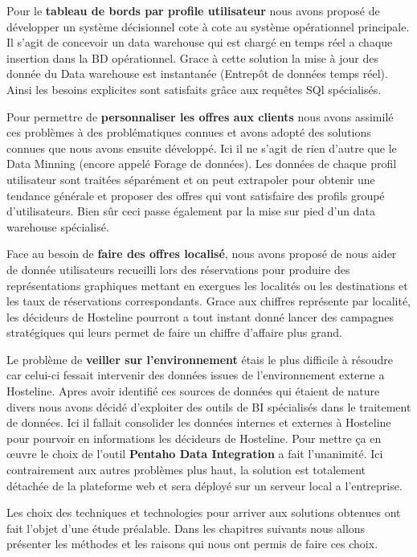 \begin{list}{•}{ }
\item Pour le \textbf{tableau de bords par profile utilisateur} nous avons proposé de développer un système décisionnel cote à cote au système opérationnel principale. Il s’agit de concevoir un data warehouse qui est chargé en temps réel a chaque insertion dans la BD opérationnel. Grace à cette solution la mise à jour des donnée du Data warehouse est instantanée (Entrepôt de données temps réel).  Ainsi les besoins explicites sont satisfaits grâce aux requêtes SQl spécialisés.\\

\item Pour permettre de \textbf{personnaliser les offres aux clients} nous avons assimilé ces problèmes à des problématiques connues et avons adopté des solutions connues que nous avons ensuite développé. Ici il ne s’agit de rien d’autre que le Data Minning (encore appelé Forage de données). Les données de chaque profil utilisateur sont traitées séparément et on peut extrapoler pour obtenir une tendance générale et proposer des offres qui vont satisfaire des profils groupé d’utilisateurs. Bien sûr ceci passe également par la mise sur pied d’un data warehouse spécialisé.

\item Face au besoin de \textbf{faire des offres localisé}, nous avons proposé de nous aider de donnée utilisateurs recueilli lors des réservations pour produire des représentations graphiques mettant en exergues les localités ou  les destinations et les taux de réservations correspondants. Grace aux chiffres représente par localité, les décideurs de Hosteline pourront a tout instant donné lancer des campagnes stratégiques qui leurs permet de faire un chiffre d’affaire plus grand.\\

\item Le problème de \textbf{veiller sur l’environnement} étais le plus difficile à résoudre car celui-ci fessait intervenir des données issues de l’environnement externe a Hosteline. Apres avoir identifié ces sources de données qui étaient de nature divers nous avons décidé d’exploiter des outils de BI spécialisés dans le traitement de données. Ici il fallait consolider les données internes et externes à Hosteline pour pourvoir en informations les décideurs de Hosteline. Pour mettre ça en œuvre le choix de l’outil \textbf{Pentaho Data Integration} a fait l’unanimité. Ici contrairement aux autres problèmes plus haut, la solution est totalement détachée de la plateforme web et sera déployé sur un serveur local a l’entreprise.

\end{list}


Les choix des techniques et technologies pour arriver aux solutions obtenues ont fait l’objet d’une étude préalable. Dans les chapitres suivants nous allons présenter les méthodes et les raisons qui nous ont permis de faire ces choix.

